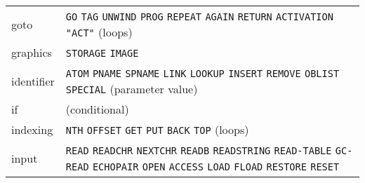 \documentclass[a4paper,]{article}
\begin{document}
\begin{longtable}[]{@{}ll@{}}
\begin{minipage}[t]{0.11\columnwidth}\raggedright\strut
goto\strut
\end{minipage} & \begin{minipage}[t]{0.83\columnwidth}\raggedright\strut
\texttt{GO} \texttt{TAG} \texttt{UNWIND} \texttt{PROG} \texttt{REPEAT} \texttt{AGAIN} \texttt{RETURN} \texttt{ACTIVATION}
\texttt{"ACT"} (loops)\strut
\end{minipage}\tabularnewline
\begin{minipage}[t]{0.11\columnwidth}\raggedright\strut
graphics\strut
\end{minipage} & \begin{minipage}[t]{0.83\columnwidth}\raggedright\strut
\texttt{STORAGE} \texttt{IMAGE}\strut
\end{minipage}\tabularnewline
\begin{minipage}[t]{0.11\columnwidth}\raggedright\strut
identifier\strut
\end{minipage} & \begin{minipage}[t]{0.83\columnwidth}\raggedright\strut
\texttt{ATOM} \texttt{PNAME} \texttt{SPNAME} \texttt{LINK} \texttt{LOOKUP} \texttt{INSERT} \texttt{REMOVE} \texttt{OBLIST}
\texttt{SPECIAL} (parameter value)\strut
\end{minipage}\tabularnewline
\begin{minipage}[t]{0.11\columnwidth}\raggedright\strut
if\strut
\end{minipage} & \begin{minipage}[t]{0.83\columnwidth}\raggedright\strut
(conditional)\strut
\end{minipage}\tabularnewline
\begin{minipage}[t]{0.11\columnwidth}\raggedright\strut
indexing\strut
\end{minipage} & \begin{minipage}[t]{0.83\columnwidth}\raggedright\strut
\texttt{NTH} \texttt{OFFSET} \texttt{GET} \texttt{PUT} \texttt{BACK} \texttt{TOP} (loops)\strut
\end{minipage}\tabularnewline
\begin{minipage}[t]{0.11\columnwidth}\raggedright\strut
input\strut
\end{minipage} & \begin{minipage}[t]{0.83\columnwidth}\raggedright\strut
\texttt{READ} \texttt{READCHR} \texttt{NEXTCHR} \texttt{READB} \texttt{READSTRING} \texttt{READ-TABLE} \texttt{GC-READ}
\texttt{ECHOPAIR} \texttt{OPEN} \texttt{ACCESS} \texttt{LOAD} \texttt{FLOAD} \texttt{RESTORE} \texttt{RESET}\strut

\end{minipage}
\end{longtable}
\end{document}
